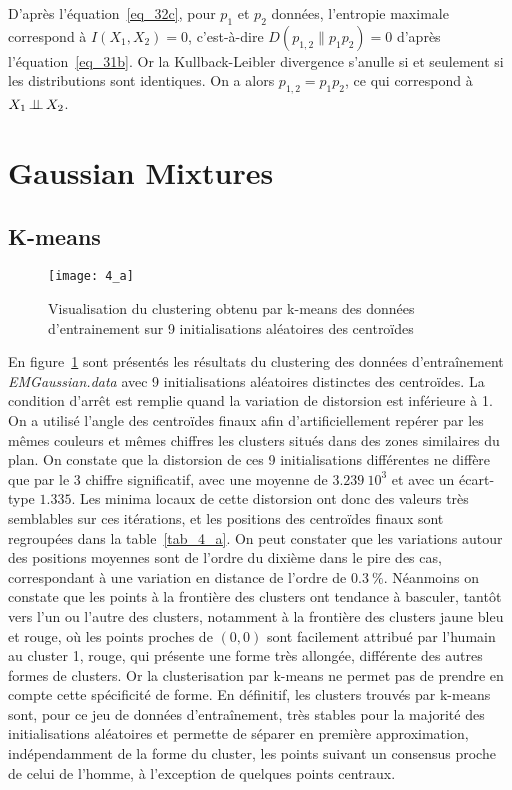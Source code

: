 \documentclass[12pt,a4paper,onecolumn]{article}
\begin{document}
D'après l'équation~\eqref{eq_32c}, pour \(p_1\) et \(p_2\) données, l'entropie maximale correspond à \(I(X_1, X_2) = 0\), c'est-à-dire \(D(p_{1, 2} \parallel p_1p_2) = 0\) d'après l'équation~\eqref{eq_31b}. Or la Kullback-Leibler divergence s'anulle si et seulement si les distributions sont identiques. On a alors \(p_{1,2} = p_1p_2\), ce qui correspond à \(X_1 \,\bot\!\!\!\bot\, X_2\).

\section{Gaussian Mixtures}

\subsection{K-means}

\begin{figure}[H]
	\centering
	\texttt{[image: 4\_a]}
	\caption{Visualisation du clustering obtenu par k-means des données d'entrainement sur 9 initialisations aléatoires des centroïdes}
	\label{fig_4_K_means}
\end{figure}

En figure~\ref{fig_4_K_means} sont présentés les résultats du clustering des données d'entraînement \textit{EMGaussian.data} avec 9 initialisations aléatoires distinctes des centroïdes. La condition d'arrêt est remplie quand la variation de distorsion est inférieure à 1. On a utilisé l'angle des centroïdes finaux afin d'artificiellement repérer par les mêmes couleurs et mêmes chiffres les clusters situés dans des zones similaires du plan. On constate que la distorsion de ces 9 initialisations différentes ne diffère que par le 3 chiffre significatif, avec une moyenne de \(3.239~10^{3}\) et avec un écart-type \(1.335\). Les minima locaux de cette distorsion ont donc des valeurs très semblables sur ces itérations, et les positions des centroïdes finaux sont regroupées dans la table~\ref{tab_4_a}. On peut constater que les variations autour des positions moyennes sont de l'ordre du dixième dans le pire des cas, correspondant à une variation en distance de l'ordre de \(0.3~\%\). Néanmoins on constate que les points à la frontière des clusters ont tendance à basculer, tantôt vers l'un ou l'autre des clusters, notamment à la frontière des clusters jaune bleu et rouge, où les points proches de \((0,0)\) sont facilement attribué par l'humain au cluster 1, rouge, qui présente une forme très allongée, différente des autres formes de clusters. Or la clusterisation par k-means ne permet pas de prendre en compte cette spécificité de forme. En définitif, les clusters trouvés par k-means sont, pour ce jeu de données d'entraînement, très stables pour la majorité des initialisations aléatoires et permette de séparer en première approximation, indépendamment de la forme du cluster, les points suivant un consensus proche de celui de l'homme, à l'exception de quelques points centraux.
\end{document}

